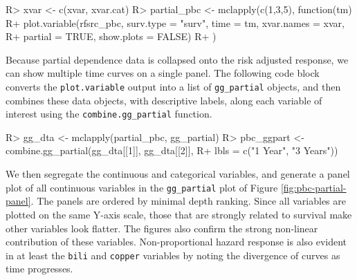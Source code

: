\documentclass[article]{jss}
\begin{document}
\begin{Schunk}
\begin{Sinput}
R> xvar <- c(xvar, xvar.cat)
R> partial_pbc <- mclapply(c(1,3,5), function(tm){
R+   plot.variable(rfsrc_pbc, surv.type = "surv", time = tm, xvar.names = xvar,
R+                 partial = TRUE, show.plots = FALSE)
R+   })
\end{Sinput}
\end{Schunk}

Because partial dependence data is collapsed onto the risk adjusted
response, we can show multiple time curves on a single panel. The
following code block converts the \texttt{plot.variable} output into a
list of \texttt{gg\_partial} objects, and then combines these data
objects, with descriptive labels, along each variable of interest using
the \texttt{combine.gg\_partial} function.

\begin{Schunk}
\begin{Sinput}
R> gg_dta <- mclapply(partial_pbc, gg_partial)
R> pbc_ggpart <- combine.gg_partial(gg_dta[[1]], gg_dta[[2]],
R+                                  lbls = c("1 Year", "3 Years"))
\end{Sinput}
\end{Schunk}

We then segregate the continuous and categorical variables, and generate
a panel plot of all continuous variables in the \texttt{gg\_partial}
plot of Figure \ref{fig:pbc-partial-panel}. The panels are ordered by
minimal depth ranking. Since all variables are plotted on the same
Y-axis scale, those that are strongly related to survival make other
variables look flatter. The figures also confirm the strong non-linear
contribution of these variables. Non-proportional hazard response is
also evident in at least the \texttt{bili} and \texttt{copper} variables
by noting the divergence of curves as time progresses.
\end{document}
